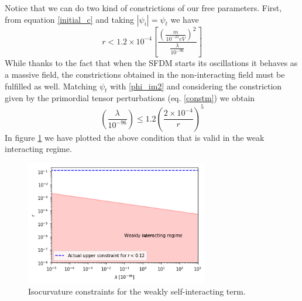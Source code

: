 \documentclass[amssymb,twocolumn,prd,nofootinbib,showpacs]{revtex4-1}
\begin{document}
Notice that we can do two kind of constrictions of our free parameters. First, from equation \eqref{initial_c} and taking $|\psi_i|=\psi_t$ we have
\begin{equation}
r<1.2\times 10^{-4}\left[\frac{\left(\frac{m}{10^{-22}eV}\right)^2}{\frac{\lambda}{10^{-96}}}\right]
\end{equation}
While thanks to the fact that when the SFDM starts its oscillations it behaves as a massive field, the constrictions obtained in the non-interacting field must be fulfilled as well. Matching $\psi_t$ with \eqref{phi_im2} and considering the constriction given by the primordial tensor perturbations (eq. \eqref{constm}) we obtain
\begin{equation}
\left(\frac{\lambda}{10^{-96}}\right)\leq 1.2\left(\frac{2\times 10^{-4}}{r}\right)^5
\end{equation}
In figure \ref{constraintsSFDMl} we have plotted the above condition that is valid in the weak interacting regime.

\begin{figure}[h]
\includegraphics[width=8cm]{lambdavsr.png}
\caption{Isocurvature constraints for the weakly self-interacting term.}\label{constraintsSFDMl}
\end{figure} 
\end{document}
